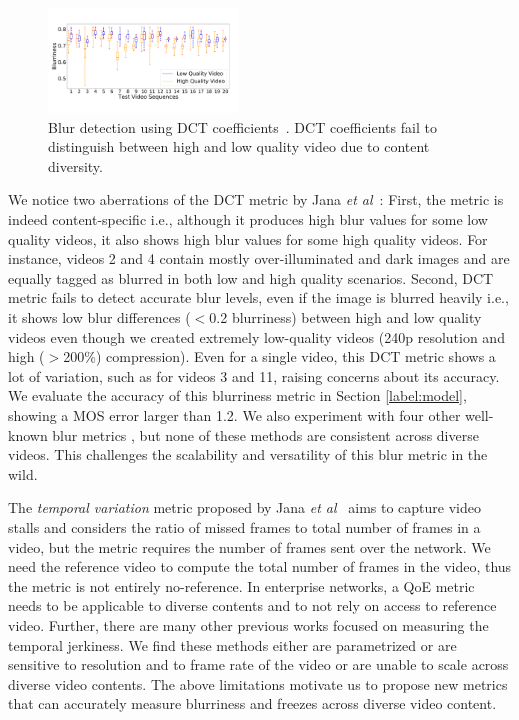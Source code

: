 \begin{figure}[t]
	\centering
	\vspace*{-2em}
	\includegraphics[width=0.45\textwidth]{sections/network-work/dct-blur}
	\vspace*{-2em}
	\caption{Blur detection using DCT coefficients~\cite{jana2016qoe,marichal1999blur}. DCT coefficients fail to distinguish between high and low quality video due to content diversity.}
	\label{fig:ucdavis}
	\vspace*{-0.5cm}
\end{figure}

We notice two aberrations of the DCT metric by Jana {\em et al}~\cite{jana2016qoe}: First, the metric is indeed content-specific i.e., although it produces high blur values for some low quality videos, it also shows high blur values for some high quality videos. For instance, videos 2 and 4 contain mostly over-illuminated and dark images and are equally tagged as blurred in both low and high quality scenarios. Second, DCT metric fails to detect accurate blur levels, even if the image is blurred heavily i.e., it shows low blur differences ($<$0.2 blurriness) between high and low quality videos even though we created extremely low-quality videos (240p resolution and high ($>$200\%) compression). Even for a single video, this DCT metric shows a lot of variation, such as for videos 3 and 11, raising concerns about its accuracy. We evaluate the accuracy of this blurriness metric in Section \ref{label:model}, showing a MOS error larger than 1.2. We also experiment with four other well-known blur metrics \cite{golestaneh2014no, mittal2012no, tong2004blur, marziliano2002no}, but none of these methods are consistent across diverse videos. This challenges the scalability and versatility of this blur metric in the wild. 

The {\em temporal variation} metric proposed by Jana {\em et al}~\cite{jana2016qoe} aims to capture video stalls and considers the ratio of missed frames to total number of frames in a video, but the metric requires the number of frames sent over the network. We need the reference video to compute the total number of frames in the video, thus the metric is not entirely no-reference. 
In enterprise networks, a QoE metric needs to be applicable to diverse contents and to not rely on access to reference video.
Further, there are many other previous works \cite{wolf2009no, borer2010model, usman2017no, pastrana2006automatic} focused on measuring the temporal jerkiness. We find these methods  either are parametrized or are sensitive to resolution and to frame rate of the video or are unable to scale across diverse video contents. The above limitations motivate us to propose new metrics that can accurately measure blurriness and freezes across diverse video content.

